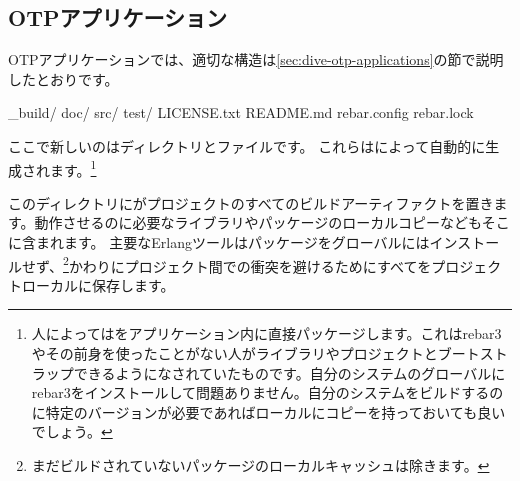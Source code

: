 \subsection{OTPアプリケーション}
\label{subsec:building-otp-applications}

OTPアプリケーションでは、適切な構造は\ref{sec:dive-otp-applications}の節で説明したとおりです。

\begin{VerbatimText}
_build/
doc/
src/
test/
LICENSE.txt
README.md
rebar.config
rebar.lock
\end{VerbatimText}

ここで新しいのはディレクトリとファイルです。
これらはによって自動的に生成されます。\footnote{人によってはをアプリケーション内に直接パッケージします。これはrebar3やその前身を使ったことがない人がライブラリやプロジェクトとブートストラップできるようになされていたものです。自分のシステムのグローバルにrebar3をインストールして問題ありません。自分のシステムをビルドするのに特定のバージョンが必要であればローカルにコピーを持っておいても良いでしょう。}

このディレクトリにがプロジェクトのすべてのビルドアーティファクトを置きます。動作させるのに必要なライブラリやパッケージのローカルコピーなどもそこに含まれます。
主要なErlangツールはパッケージをグローバルにはインストールせず、\footnote{まだビルドされていないパッケージのローカルキャッシュは除きます。}かわりにプロジェクト間での衝突を避けるためにすべてをプロジェクトローカルに保存します。

